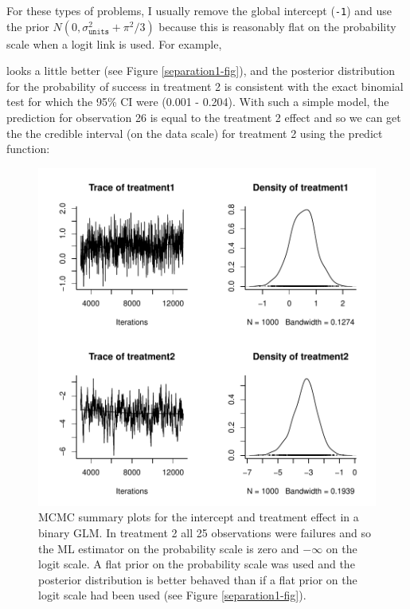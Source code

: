 \documentclass{article}
\begin{document}
For these types of problems, I usually remove the global intercept (\texttt{-1}) and use the prior $N(0, \sigma^{2}_{\texttt{units}}+\pi^2/3)$ because this is reasonably flat on the probability scale when a logit link is used. For example,

\begin{Schunk}
\end{Schunk}


looks a little better (see Figure \ref{separation1-fig}), and the posterior distribution for the probability of success in treatment 2 is consistent with the exact binomial test for which the 95\% CI were (0.001 - 0.204). With such a simple model, the prediction for observation 26 is equal to the  treatment 2 effect and so we can get the the credible interval (on the data scale) for treatment 2 using the predict function:




\begin{figure}[!h]
\begin{center}
\includegraphics{Lecture2-085}
\end{center}
\caption{MCMC summary plots for the intercept and treatment effect in a binary GLM. In treatment 2 all 25 observations were failures and so the ML estimator on the probability scale is zero and $-\infty$ on the logit scale. A flat prior on the probability scale was used and the posterior distribution is better behaved than if a flat prior on the logit scale had been used (see Figure \ref{separation1-fig}).}
\label{separation2-fig}
\end{figure}
\end{document}
